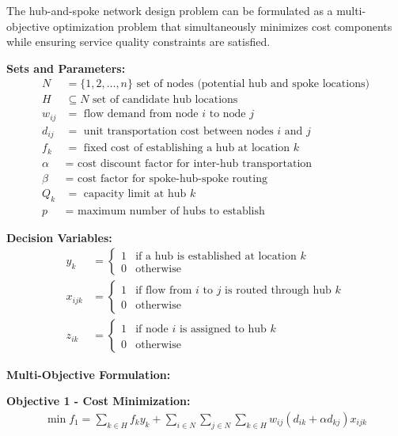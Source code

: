\documentclass{article}
\begin{document}
The hub-and-spoke network design problem can be formulated as a multi-objective optimization problem that simultaneously minimizes cost components while ensuring service quality constraints are satisfied.

\textbf{Sets and Parameters:}
\begin{align}
N &= \{1, 2, \ldots, n\} \text{ set of nodes (potential hub and spoke locations)} \\
H &\subseteq N \text{ set of candidate hub locations} \\
w_{ij} &= \text{ flow demand from node } i \text{ to node } j \\
d_{ij} &= \text{ unit transportation cost between nodes } i \text{ and } j \\
f_k &= \text{ fixed cost of establishing a hub at location } k \\
\alpha &= \text{ cost discount factor for inter-hub transportation} \\
\beta &= \text{ cost factor for spoke-hub-spoke routing} \\
Q_k &= \text{ capacity limit at hub } k \\
p &= \text{ maximum number of hubs to establish}
\end{align}

\textbf{Decision Variables:}
\begin{align}
y_k &= \begin{cases} 
1 & \text{if a hub is established at location } k \\
0 & \text{otherwise}
\end{cases} \\
x_{ijk} &= \begin{cases}
1 & \text{if flow from } i \text{ to } j \text{ is routed through hub } k \\
0 & \text{otherwise}
\end{cases} \\
z_{ik} &= \begin{cases}
1 & \text{if node } i \text{ is assigned to hub } k \\
0 & \text{otherwise}
\end{cases}
\end{align}

\textbf{Multi-Objective Formulation:}

\textbf{Objective 1 - Cost Minimization:}
\begin{align}
\min f_1 = \sum_{k \in H} f_k y_k + \sum_{i \in N} \sum_{j \in N} \sum_{k \in H} w_{ij} \left( d_{ik} + \alpha d_{kj} \right) x_{ijk}
\end{align}
\end{document}
